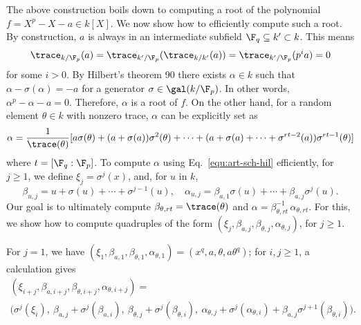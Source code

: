 The above construction boils down to computing a root of the polynomial $f = X^p - X - a \in k[X]$.
We now show how to efficiently compute such a root.
By construction, $a$ is always in an intermediate subfield 
$\F_q \subseteq k' \subset k$. This means 
\[ \trace_{k / \F_p}(a) = \trace_{k' / \F_p}(\trace_{k / k'}(a)) = \trace_{k' / \F_p}(p^ia) = 0  \]
for some $i > 0$. By Hilbert's theorem 90 there exists $\alpha \in k$ such that $\alpha - 
\sigma(\alpha) = -a$ for a generator $\sigma \in \gal(k / \F_p)$. In other words, $\alpha^p - 
\alpha - a = 0$. Therefore, $\alpha$ is a root of $f$. On the other hand, for a random element 
$\theta \in k$ with nonzero trace, $\alpha$ can be explicitly set as
\begin{equation}
	\label{equ:art-sch-hil}
	\alpha = \frac{1}{\trace(\theta)}[a\sigma(\theta) + (a + \sigma(a))\sigma^2(\theta) + \cdots + 
	(a + \sigma(a) + \cdots + \sigma^{rt - 2}(a))\sigma^{rt - 1}(\theta)]
\end{equation}
where $t = [\F_q : \F_p]$.
To compute $\alpha$ using Eq.~\eqref{equ:art-sch-hil} efficiently, for $j \ge 1$, we define
$ \xi_j = \sigma^j(x)$, and, 
for $u$ in $k$, 
\[ \beta_{u,j} = u + \sigma(u) + \cdots + \sigma^{j - 1}(u), \quad 
\alpha_{u,j} = \beta_{a,1}\sigma(u) + \cdots +
\beta_{a,j}\sigma^j(u). \] Our goal is to ultimately compute
$\beta_{\theta,rt}=\trace(\theta) $ and $\alpha =
\beta_{\theta,rt}^{-1}\,\alpha_{\theta,rt}$. For this, we show how to
compute quadruples of the form $(\xi_j, \beta_{a,j}, \beta_{\theta,j},
\alpha_{\theta,j})$, for $j \ge 1$.

For $j=1$, we have $(\xi_1, \beta_{a,1}, \beta_{\theta,1}, \alpha_{\theta,1})=(x^q,a,\theta,a\theta^q)$;
 for $i,j \ge 1$, a calculation gives
\begin{multline}
(\xi_{i+j},\beta_{a,i+j},\beta_{\theta,i+j}, \alpha_{\theta,i + j}) =\\
\big(\sigma^j(\xi_i),\
  \beta_{a,j} + \sigma^j(\beta_{a,i}),\ 
  \beta_{\theta,j} + \sigma^j(\beta_{\theta,i}),\
  \alpha_{\theta,j} + \sigma^j(\alpha_{\theta,i}) + \beta_{a,j}\sigma^{j + 1}(\beta_{\theta,i})\big).
\end{multline}

